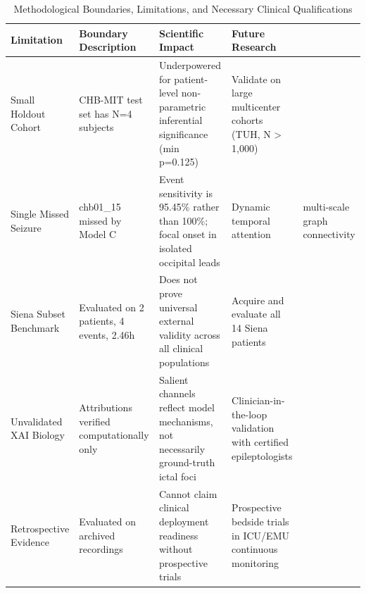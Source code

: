 \begin{table}[t]
\centering
\caption{Methodological Boundaries, Limitations, and Necessary Clinical Qualifications}
\label{tab:limitations_boundaries}
\small
\begin{tabular}{llll}
\toprule
Limitation & Boundary Description & Scientific Impact & Future Research \\
\midrule
Small Holdout Cohort & CHB-MIT test set has N=4 subjects & Underpowered for patient-level non-parametric inferential significance (min p=0.125) & Validate on large multicenter cohorts (TUH, N > 1,000) \\
Single Missed Seizure & chb01\_15 missed by Model C & Event sensitivity is 95.45\% rather than 100\%; focal onset in isolated occipital leads & Dynamic temporal attention & multi-scale graph connectivity \\
Siena Subset Benchmark & Evaluated on 2 patients, 4 events, 2.46h & Does not prove universal external validity across all clinical populations & Acquire and evaluate all 14 Siena patients \\
Unvalidated XAI Biology & Attributions verified computationally only & Salient channels reflect model mechanisms, not necessarily ground-truth ictal foci & Clinician-in-the-loop validation with certified epileptologists \\
Retrospective Evidence & Evaluated on archived recordings & Cannot claim clinical deployment readiness without prospective trials & Prospective bedside trials in ICU/EMU continuous monitoring \\
\bottomrule
\end{tabular}
\end{table}
